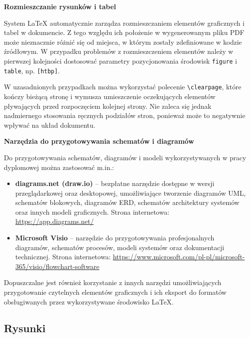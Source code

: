 \noindent
\textbf{Rozmieszczanie rysunków i tabel}

System \LaTeX{} automatycznie zarządza rozmieszczaniem elementów graficznych i tabel w dokumencie. Z tego względu ich położenie w wygenerowanym pliku PDF może nieznacznie różnić się od miejsca, w którym zostały zdefiniowane w kodzie źródłowym. W przypadku problemów z rozmieszczeniem elementów należy w pierwszej kolejności dostosować parametry pozycjonowania środowisk \texttt{figure} i \texttt{table}, np. \texttt{[htbp]}.

W uzasadnionych przypadkach można wykorzystać polecenie \verb|\clearpage|, które kończy bieżącą stronę i wymusza umieszczenie oczekujących elementów pływających przed rozpoczęciem kolejnej strony. Nie zaleca się jednak nadmiernego stosowania ręcznych podziałów stron, ponieważ może to negatywnie wpływać na układ dokumentu.

\medskip
\noindent
\textbf{Narzędzia do przygotowywania schematów i diagramów}

Do przygotowywania schematów, diagramów i modeli wykorzystywanych w pracy dyplomowej można zastosować m.in.:

\begin{itemize}

    \item \textbf{diagrams.net (draw.io)} -- bezpłatne narzędzie dostępne w wersji przeglądarkowej oraz desktopowej,
    umożliwiające tworzenie diagramów UML, schematów blokowych, diagramów ERD, schematów architektury systemów     oraz innych modeli graficznych. Strona internetowa: \url{https://app.diagrams.net/}

    \item \textbf{Microsoft Visio} -- narzędzie do przygotowywania profesjonalnych diagramów, schematów procesów, modeli systemów oraz dokumentacji technicznej. Strona internetowa:
    \url{https://www.microsoft.com/pl-pl/microsoft-365/visio/flowchart-software}

\end{itemize}

Dopuszczalne jest również korzystanie z innych narzędzi umożliwiających przygotowanie czytelnych elementów graficznych i ich eksport do formatów obsługiwanych przez wykorzystywane środowisko \LaTeX{}.


\subsection{Rysunki}

